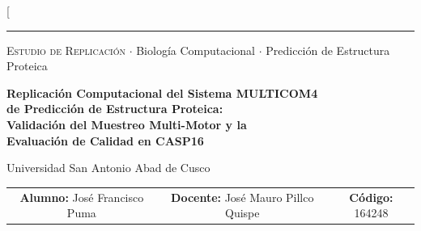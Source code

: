 \documentclass[10pt,twocolumn,a4paper]{article}
\begin{document}
\thispagestyle{firstpage}

\twocolumn[
\begin{@twocolumnfalse}
\vspace{-0.5cm}

\noindent
\begin{minipage}{\textwidth}
\noindent\textcolor{headerblue}{\rule{\textwidth}{2pt}}
\vspace{6pt}

\begin{center}
{\small\sffamily\color{gray}\textsc{Estudio de Replicación} $\cdot$ Biología Computacional $\cdot$ Predicción de Estructura Proteica}
\end{center}

\vspace{8pt}

\begin{center}
{\LARGE\bfseries\sffamily\color{headerblue}
Replicación Computacional del Sistema MULTICOM4\\[4pt]
de Predicción de Estructura Proteica:\\[4pt]
Validación del Muestreo Multi-Motor y la\\[4pt]
Evaluación de Calidad en CASP16}
\end{center}

\vspace{10pt}

\begin{center}
{\large\sffamily\color{headerblue!70!black} Universidad San Antonio Abad de Cusco}
\end{center}

\vspace{10pt}

\noindent
\begin{tabular*}{\textwidth}{@{\extracolsep{\fill}} ccc }
{\small\sffamily\color{gray}\textbf{Alumno:} José Francisco Puma} &
{\small\sffamily\color{gray}\textbf{Docente:} José Mauro Pillco Quispe} &
{\small\sffamily\color{gray}\textbf{Código:} 164248} \\
\end{tabular*}

\vspace{14pt}


\end{minipage}
\end{@twocolumnfalse}
\end{document}
